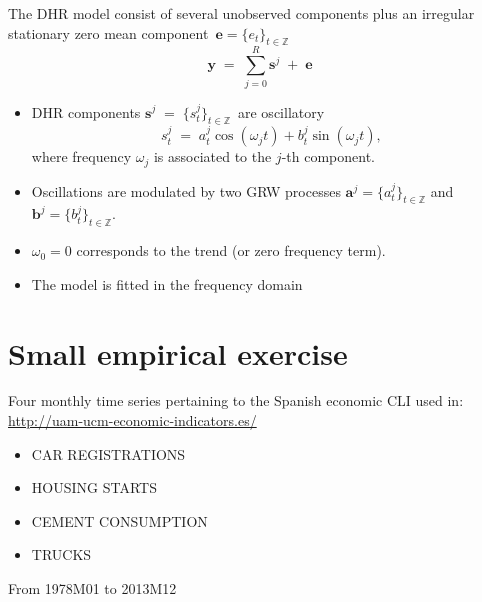 \begin{slide}

  The {DHR} model consist of several unobserved components plus an
  irregular stationary zero mean component
  $\,{\boldsymbol{e}}=\{e_{t}\}_{t\in\mathbb{Z}}\,$
  \begin{equation}
    \boldsymbol{y}\;=\;\sum_{j=0}^{R}\boldsymbol{s}^{j}\;+\;\boldsymbol{e}
  \end{equation}
  \begin{itemize}
  \item {DHR} components
    \;$\boldsymbol{s}^{j}\;=\;\{s_{t}^{j}\}_{t\in\mathbb{Z}}\,$\; are
    oscillatory
    \begin{equation}
      s_{t}^{j}\; =\; a_{t}^{j}\cos(\omega_{j}t)+b_{t}^{j}\sin(\omega_{j}t),
    \end{equation}
    where frequency $\omega_{j}$ is associated to the $j$-th component.
  \item Oscillations are modulated by two {GRW} processes 
    \;$\boldsymbol{a}^{j} = \{a^{j}_t\}_{t\in\mathbb{Z}}$\; and
    \;$\boldsymbol{b}^{j} = \{b^{j}_t\}_{t\in\mathbb{Z}}$.
  \item $\omega_{0}=0$ corresponds to the trend (or zero frequency
    term).
  \item The model is fitted in the frequency domain
  \end{itemize}
\end{slide}

\section[Exercise]{Small empirical exercise}

\begin{slide}

  Four monthly time series pertaining to the Spanish economic CLI used
  in: \url{http://uam-ucm-economic-indicators.es/}
  \bigskip
  
  \begin{itemize}
  \item CAR REGISTRATIONS
  \item HOUSING STARTS
  \item CEMENT CONSUMPTION
  \item TRUCKS
  \end{itemize}
  \bigskip

  From 1978M01 to 2013M12
\end{slide}


